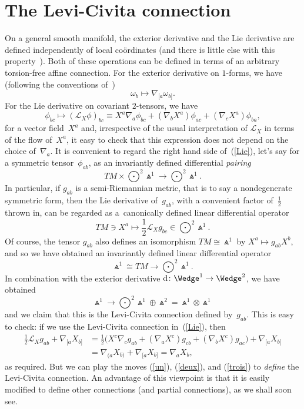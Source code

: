 \documentclass[10pt,a4paper]{amsart}
\numberwithin{equation}{section}
\begin{document}
\section{The Levi-Civita connection}\label{LC}
On a general smooth manifold, the exterior derivative and the Lie derivative
are defined independently of local co\"ordinates (and there is little else with
this property~\cite{KMS}). Both of these operations can be defined in terms of
an arbitrary torsion-free affine connection. For the exterior derivative on
$1$-forms, we have (following the conventions of~\cite[equation~(4.3.14)]{OT})
\[\omega_b\longmapsto\nabla_{[a}\omega_{b]}.\]
For the Lie derivative on covariant $2$-tensors, we have
\begin{equation}\label{Lie}
\phi_{bc}\longmapsto({\mathcal{L}}_X\phi)_{bc}\equiv
X^a\nabla_a\phi_{bc}+(\nabla_bX^a)\phi_{ac}+(\nabla_cX^a)\phi_{ba},
\end{equation}
for a vector field~$X^a$ and, irrespective of the usual interpretation of
${\mathcal{L}}_X$ in terms of the flow of~$X^a$, it easy to check that this
expression does not depend on the choice of~$\nabla_a$. It is convenient to
regard the right hand side of~(\ref{Lie}), let's say for a symmetric
tensor~$\phi_{ab}$, as an invariantly defined differential {\em pairing}
\[\textstyle TM\times\bigodot^2\!\Wedge^1\longrightarrow
\bigodot^2\!\Wedge^1.\]
In particular, if $g_{ab}$ is a semi-Riemannian metric, that is to say a
nondegenerate symmetric form, then the Lie derivative of~$g_{ab}$, with a
convenient factor of~$\frac12$ thrown in, can be regarded as a~canonically
defined linear differential operator
\begin{equation}\label{un}
\textstyle TM\ni
X^a\longmapsto
\frac12{\mathcal{L}}_Xg_{bc}\in\bigodot^2\!\Wedge^1.\end{equation}
Of course,
the tensor $g_{ab}$ also defines an isomorphism $TM\cong\Wedge^1$ by
$X^a\mapsto g_{ab}X^b$, and so we have obtained an invariantly defined linear
differential operator
\begin{equation}\label{deux}
\textstyle\Wedge^1\cong TM\longrightarrow\bigodot^2\!\Wedge^1.\end{equation}
In combination with the exterior derivative ${\rm d}\colon \Wedge^1\to\Wedge^2$, we have
obtained
\begin{equation}\label{trois}
\textstyle\Wedge^1\longrightarrow\bigodot^2\!\Wedge^1\oplus\Wedge^2=
\Wedge^1\otimes\Wedge^1\end{equation}
and we claim that this is the Levi-Civita connection defined by~$g_{ab}$. This
is easy to check: if we use the Levi-Civita connection in~(\ref{Lie}), then
\begin{align*}\tfrac12{\mathcal{L}}_Xg_{ab}+\nabla_{[a}X_{b]}
&= \tfrac12\big(X^c\nabla_cg_{ab}+(\nabla_aX^c)g_{cb}+(\nabla_bX^c)g_{ac}\big) +\nabla_{[a}X_{b]}\\
&= \nabla_{(a}X_{b)}+\nabla_{[a}X_{b]}=\nabla_aX_b,
\end{align*}
as required. But we can play the moves (\ref{un}), (\ref{deux}), and
(\ref{trois}) to {\em define} the Levi-Civita connection. An advantage of
this viewpoint is that it is easily modified to define other connections (and
partial connections), as we shall soon see.
\end{document}
